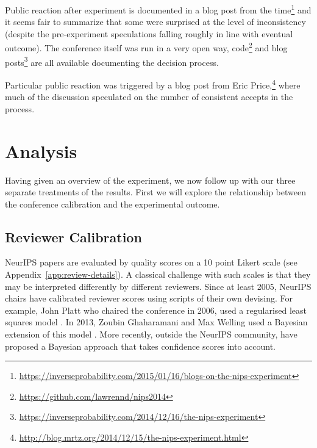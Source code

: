 \documentclass[twoside]{article}
\begin{document}
Public reaction after experiment is documented in a blog post from the time\footnote{\url{https://inverseprobability.com/2015/01/16/blogs-on-the-nips-experiment}} and it seems fair to summarize that some were surprised at the level of inconsistency (despite the pre-experiment speculations falling roughly in line with eventual outcome). The conference itself was run in a very open way, code\footnote{\url{https://github.com/lawrennd/nips2014}} and blog
  posts\footnote{\url{https://inverseprobability.com/2014/12/16/the-nips-experiment}} are all available documenting the decision process.  

Particular public reaction was triggered by a blog post from Eric Price,\footnote{\url{http://blog.mrtz.org/2014/12/15/the-nips-experiment.html}} where much of the discussion speculated on the number of consistent accepts in
the process. 

\section{Analysis}
Having given an overview of the experiment, we now follow up with our
three separate treatments of the results. First we will explore the
relationship between the conference calibration and the experimental
outcome.

\subsection{Reviewer Calibration}
\label{sec:calibration}
NeurIPS papers are evaluated by quality scores on a 10 point Likert
scale (see Appendix~\ref{app:review-details}). A
classical challenge with such scales is that they may be interpreted
differently by different reviewers. Since at least 2005, NeurIPS
chairs have calibrated reviewer scores using scripts of their
own devising. For example, John Platt who chaired the conference in
2006, used a regularised least squares model \citep{Platt-calibration12}. In 2013, Zoubin Ghaharamani
and Max Welling used a Bayesian extension of this model
\citep{Ge-bayesian15}. More recently, outside the NeurIPS community, \cite{MacKay-calibration17} have proposed a Bayesian approach that takes confidence scores into account. 
\end{document}
